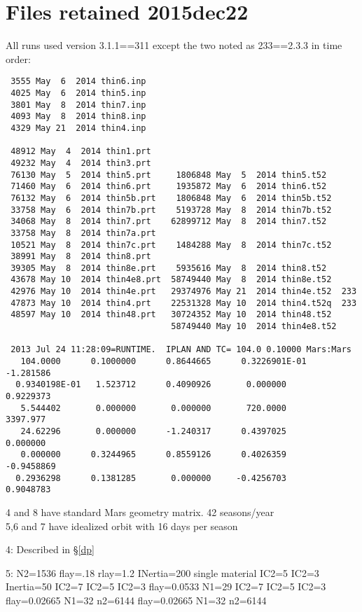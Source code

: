 \documentclass{article}  %
\begin{document}
\appendix  
\section{Files retained 2015dec22}
 All runs used version 3.1.1==311 except the two noted as 233==2.3.3
in time order:\vspace{-3.mm} 
\begin{verbatim}
 3555 May  6  2014 thin6.inp
 4025 May  6  2014 thin5.inp
 3801 May  8  2014 thin7.inp
 4093 May  8  2014 thin8.inp
 4329 May 21  2014 thin4.inp

 48912 May  4  2014 thin1.prt        
 49232 May  4  2014 thin3.prt     
 76130 May  5  2014 thin5.prt     1806848 May  5  2014 thin5.t52
 71460 May  6  2014 thin6.prt     1935872 May  6  2014 thin6.t52      
 76132 May  6  2014 thin5b.prt    1806848 May  6  2014 thin5b.t52      
 33758 May  6  2014 thin7b.prt    5193728 May  8  2014 thin7b.t52     
 34068 May  8  2014 thin7.prt    62899712 May  8  2014 thin7.t52  
 33758 May  8  2014 thin7a.prt     
 10521 May  8  2014 thin7c.prt    1484288 May  8  2014 thin7c.t52
 38991 May  8  2014 thin8.prt                                        
 39305 May  8  2014 thin8e.prt    5935616 May  8  2014 thin8.t52      
 43678 May 10  2014 thin4e8.prt  58749440 May  8  2014 thin8e.t52      
 42976 May 10  2014 thin4e.prt   29374976 May 21  2014 thin4e.t52  233 
 47873 May 10  2014 thin4.prt    22531328 May 10  2014 thin4.t52q  233
 48597 May 10  2014 thin48.prt   30724352 May 10  2014 thin48.t52  
                                 58749440 May 10  2014 thin4e8.t52 

 2013 Jul 24 11:28:09=RUNTIME.  IPLAN AND TC= 104.0 0.10000 Mars:Mars
   104.0000      0.1000000      0.8644665      0.3226901E-01  -1.281586     
  0.9340198E-01   1.523712      0.4090926       0.000000      0.9229373    
   5.544402       0.000000       0.000000       720.0000       3397.977    
   24.62296       0.000000      -1.240317      0.4397025       0.000000    
   0.000000      0.3244965      0.8559126      0.4026359     -0.9458869    
  0.2936298      0.1381285       0.000000     -0.4256703      0.9048783 
\end{verbatim}      
4 and 8 have standard Mars geometry matrix. 42 seasons/year
\\ 5,6 and 7 have idealized orbit with 16 days per season

4: Described in \S \ref{dp} 

5: N2=1536 flay=.18 rlay=1.2 INertia=200
 single material
\qi IC2=5
\qi IC2=3
\qi Inertia=50  IC2=7
\qi IC2=5
\qi IC2=3
\qi flay=0.0533 N1=29  IC2=7
\qi IC2=5
\qi IC2=3
\qi flay=0.02665 N1=32  n2=6144
\qi flay=0.02665 N1=32  n2=6144
\end{document}
